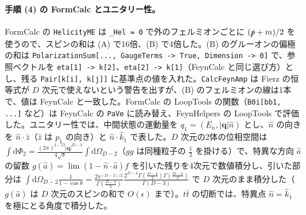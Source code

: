 \documentclass[a4paper,10pt]{ltjsarticle}
\begin{document}
\paragraph{手順 (4) の FormCalc とユニタリー性。}FormCalc の \texttt{HelicityME} は \texttt{\_Hel = 0} で外のフェルミオンごとに $(\slashed p+m)/2$ を使うので、スピンの和は (A) で16倍、(B) で4倍した。(B) のグルーオンの偏極の和は \texttt{PolarizationSum[..., GaugeTerms -> True, Dimension -> 0]} で、参照ベクトルを \texttt{eta[1] -> k[2]}、\texttt{eta[2] -> k[1]}（FeynCalc と同じ選び方）とし、残る \texttt{Pair[k[i], k[j]]} に基準点の値を入れた。\texttt{CalcFeynAmp} は Fierz の恒等式が $D$ 次元で使えないという警告を出すが、(B) のフェルミオンの線は1本で、値は FeynCalc と一致した。FormCalc の LoopTools の関数（\texttt{B0i[bb1, ...]} など）は FeynCalc の \texttt{PaVe} に読み替え、FeynHelpers の LoopTools で評価した。ユニタリー性では、中間状態の運動量を $q_1=(E_n,|\boldsymbol q|\hat n)$ とし、$\hat n$ の向きを $\hat n\cdot\hat z$（$\hat z$ は $p_1$ の向き）と $\hat n\cdot\hat k_1$ で表した。$D$ 次元の2体の位相空間は $\int\mathrm d\Phi_2=\frac{(2\pi)^{2-D}|\boldsymbol q|^{D-3}}{4\sqrt s}\int\mathrm d\Omega_{D-2}$（$gg$ は同種粒子の $\frac12$ を掛ける）で、特異な方向 $\hat a$ の留数 $g(\hat a)=\lim(1-\hat n\cdot\hat a)f$ を引いた残りを4次元で数値積分し、引いた部分は $\int\mathrm d\Omega_{D-2}\frac{1}{1-\cos\theta}=\frac{2\pi^{(D-2)/2}}{\Gamma(\frac{D-2}2)}\frac{2^{D-4}\Gamma(\frac{D-4}{2})\Gamma(\frac{D-2}{2})}{\Gamma(D-3)}$ で $D$ 次元のまま積分した（$g(\hat a)$ は $D$ 次元のスピンの和で $O(\epsilon)$ まで）。$t\bar t$ の切断では、特異点 $\hat n=\hat k_1$ を極にとる角度で積分した。
\end{document}
